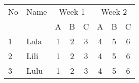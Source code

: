 \begin{table}
	\centering
	\label{tab:rowSpanning}
	\begin{tabular}{|l|l|*{6}{c|}}
		\hline %
		No & Name & \multicolumn{3}{|c|}{Week 1} & \multicolumn{3}{|c|}{Week 2} \\
		\cline{3-8} %
		& & A & B & C & A & B & C\\
		\hline
		1 & Lala & 1 & 2 & 3 & 4 & 5 & 6\\
		2 & Lili & 1 & 2 & 3 & 4 & 5 & 6\\
		3 & Lulu & 1 & 2 & 3 & 4 & 5 & 6\\
		\hline
	\end{tabular}
\end{table}
